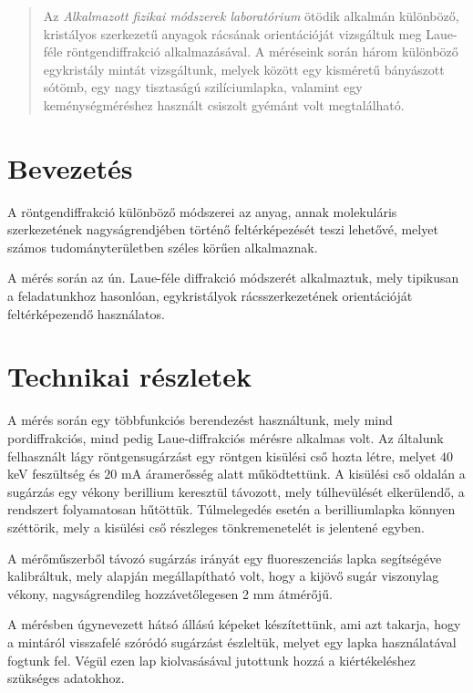 \begin{abstract}
    \noindent Az \emph{Alkalmazott fizikai módszerek laboratórium} ötödik alkalmán különböző, kristályos szerkezetű anyagok rácsának orientációját vizsgáltuk meg Laue-féle röntgendiffrakció alkalmazásával. A méréseink során három különböző egykristály mintát vizsgáltunk, melyek között egy kisméretű bányászott sótömb, egy nagy tisztaságú szilíciumlapka, valamint egy keménységméréshez használt csiszolt gyémánt volt megtalálható.
\end{abstract}

\begin{multicols}{2}
\section{Bevezetés}
A röntgendiffrakció különböző módszerei az anyag, annak molekuláris szerkezetének nagyságrendjében történő feltérképezését teszi lehetővé, melyet számos tudományterületben széles körűen alkalmaznak. \par
A mérés során az ún. Laue-féle diffrakció módszerét alkalmaztuk, mely tipikusan a feladatunkhoz hasonlóan, egykristályok rácsszerkezetének orientációját feltérképezendő használatos.

\section{Technikai részletek}
A mérés során egy többfunkciós berendezést használtunk, mely mind pordiffrakciós, mind pedig Laue-diffrakciós mérésre alkalmas volt. Az általunk felhasznált lágy röntgensugárzást egy röntgen kisülési cső hozta létre, melyet $40$ keV feszültség és $20$ mA áramerősség alatt működtettünk. A kisülési cső oldalán a sugárzás egy vékony berillium  keresztül távozott, mely túlhevülését elkerülendő, a rendszert folyamatosan hűtöttük. Túlmelegedés esetén a berilliumlapka könnyen széttörik, mely a kisülési cső részleges tönkremenetelét is jelentené egyben. \par
A mérőműszerből távozó sugárzás irányát egy fluoreszenciás lapka segítségéve kalibráltuk, mely alapján megállapítható volt, hogy a kijövő sugár viszonylag vékony, nagyságrendileg hozzávetőlegesen 2 mm átmérőjű. \par
A mérésben úgynevezett hátsó állású képeket készítettünk, ami azt takarja, hogy a mintáról visszafelé szóródó sugárzást észleltük, melyet egy  lapka használatával fogtunk fel. Végül ezen lap kiolvasásával jutottunk hozzá a kiértékeléshez szükséges adatokhoz.


\end{multicols}
